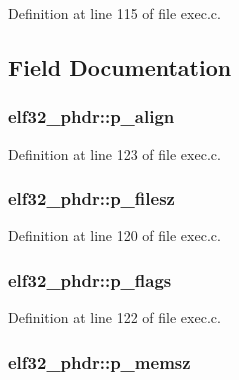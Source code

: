 Definition at line 115 of file exec.\+c.



\subsection{Field Documentation}
\hypertarget{structelf32__phdr_a36b59708697a8e025409ec1a2614acdf}{
\subsubsection[{p\+\_\+align}]{ elf32\+\_\+phdr\+::p\+\_\+align}}\label{structelf32__phdr_a36b59708697a8e025409ec1a2614acdf}


Definition at line 123 of file exec.\+c.

\hypertarget{structelf32__phdr_a4b9173c35966a1ad03681a72ceabe291}{
\subsubsection[{p\+\_\+filesz}]{ elf32\+\_\+phdr\+::p\+\_\+filesz}}\label{structelf32__phdr_a4b9173c35966a1ad03681a72ceabe291}


Definition at line 120 of file exec.\+c.

\hypertarget{structelf32__phdr_a988c9108c42fa294891b5f94d60cb06e}{
\subsubsection[{p\+\_\+flags}]{ elf32\+\_\+phdr\+::p\+\_\+flags}}\label{structelf32__phdr_a988c9108c42fa294891b5f94d60cb06e}


Definition at line 122 of file exec.\+c.

\hypertarget{structelf32__phdr_af44d75db8b3ebcfa04742e55b49e7eb6}{
\subsubsection[{p\+\_\+memsz}]{ elf32\+\_\+phdr\+::p\+\_\+memsz}}\label{structelf32__phdr_af44d75db8b3ebcfa04742e55b49e7eb6}


